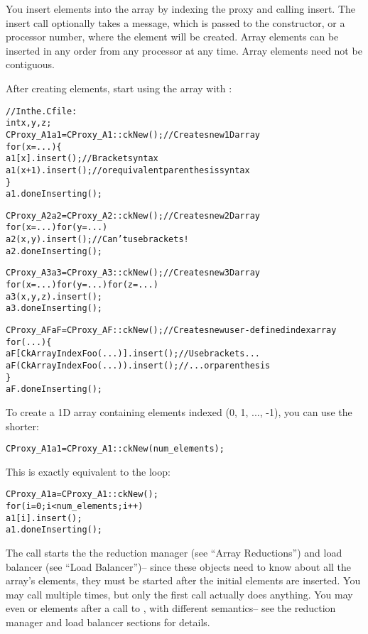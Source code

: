 You insert elements into the array by indexing the proxy
and calling insert.  The insert call optionally takes 
a message, which is passed to the constructor, or a
processor number, where the element will be created.
Array elements can be inserted in any order from 
any processor at any time.  Array elements need not 
be contiguous.

After creating elements, start using the array with 
:

\begin{alltt}
//In the .C file:
int x,y,z;
CProxy_A1 a1=CProxy_A1::ckNew();  //Creates new 1D array
for (x=...) \{
   a1[x  ].insert();  //Bracket syntax
   a1(x+1).insert();  // or equivalent parenthesis syntax
\}
a1.doneInserting();

CProxy_A2 a2=CProxy_A2::ckNew();   //Creates new 2D array
for (x=...) for (y=...)
   a2(x,y).insert();  //Can't use brackets!
a2.doneInserting();

CProxy_A3 a3=CProxy_A3::ckNew();   //Creates new 3D array
for (x=...) for (y=...) for (z=...)
   a3(x,y,z).insert();
a3.doneInserting();

CProxy_AF aF=CProxy_AF::ckNew();   //Creates new user-defined index array
for (...) \{
   aF[CkArrayIndexFoo(...)].insert(); //Use brackets...
   aF(CkArrayIndexFoo(...)).insert(); //  ...or parenthesis
\}
aF.doneInserting();

\end{alltt}

To create a 1D array containing elements indexed 
(0, 1, ..., -1), you can use the shorter:

\begin{alltt}
CProxy_A1 a1 = CProxy_A1::ckNew(num_elements);
\end{alltt}

This is exactly equivalent to the loop:
\begin{alltt}
CProxy_A1 a = CProxy_A1::ckNew();
for (i=0;i<num_elements;i++)
	a1[i].insert();
a1.doneInserting();
\end{alltt}


The  call starts the the reduction manager (see ``Array
Reductions'') and load balancer (see ``Load Balancer'')-- since
these objects need to know about all the array's elements, they
must be started after the initial elements are inserted.
You may call  multiple times, but only the first
call actually does anything.  You may even  or 
elements after a call to , with different semantics-- 
see the reduction manager and load balancer sections for details.

